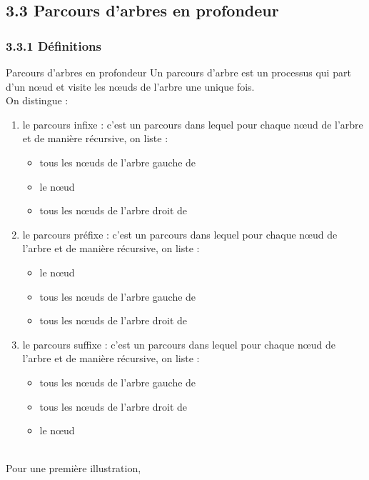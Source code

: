 \documentclass[11pt,a4paper,french,twoside]{PMCours}
\begin{document}
\newpage\noindent
\subsection*{3.3 Parcours d'arbres en profondeur}
\subsubsection*{3.3.1 Définitions}
\begin{Definition}{Parcours d'arbres en profondeur}
Un parcours d'arbre est un processus qui part d'un nœud et visite les nœuds de l'arbre une unique fois.\\
On distingue :   
\begin{enumerate}
\item le parcours infixe : c'est un parcours dans lequel pour chaque nœud  de l'arbre et de manière récursive, on liste :
\begin{itemize}
\item tous les nœuds de l'arbre gauche de 
\item le nœud 
\item tous les nœuds de l'arbre droit de 
\end{itemize}
\item le parcours préfixe : c'est un parcours dans lequel pour chaque nœud  de l'arbre et de manière récursive, on liste :
\begin{itemize}
\item le nœud 
\item tous les nœuds de l'arbre gauche de 
\item tous les nœuds de l'arbre droit de 
\end{itemize}
\item le parcours suffixe : c'est un parcours dans lequel pour chaque nœud  de l'arbre et de manière récursive, on liste :
\begin{itemize}
\item tous les nœuds de l'arbre gauche de 
\item tous les nœuds de l'arbre droit de 
\item le nœud 
\end{itemize}
\end{enumerate}
\end{Definition} \medskip\\
Pour une première illustration, 
\end{document}
